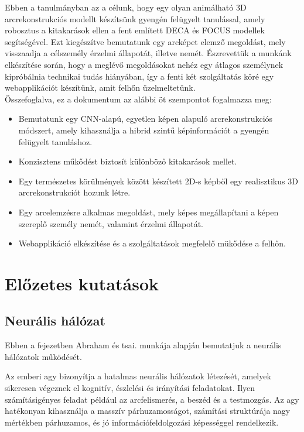 \documentclass[12pt,a4]{article}
\begin{document}
        Ebben a tanulmányban az a célunk, hogy egy olyan animálható 3D arcrekonstrukciós modellt készítsünk gyengén felügyelt tanulással, amely robosztus a kitakarások ellen a fent említett DECA és FOCUS modellek segítségével. Ezt kiegészítve bemutatunk egy arcképet elemző megoldást, mely visszaadja a célszemély érzelmi állapotát, illetve nemét. Észrevettük a munkánk elkészítése során, hogy a meglévő megoldásokat nehéz egy átlagos személynek kipróbálnia technikai tudás hiányában, így a fenti két szolgáltatás köré egy webapplikációt készítünk, amit felhőn üzelmeltetünk.\\

        Összefoglalva, ez a dokumentum az alábbi öt szempontot fogalmazza meg:
        \begin{itemize}
	       \item Bemutatunk egy CNN-alapú, egyetlen képen alapuló arcrekonstrukciós módszert, amely kihasználja a hibrid szintű képinformációt a gyengén felügyelt tanuláshoz.
	       \item Konzisztens műkődést biztosít különböző kitakarások mellet.
	       \item Egy természetes körülmények között készített 2D-s képből egy realisztikus 3D arcrekonstrukciót hozunk létre.
	       \item Egy arcelemzésre alkalmas megoldást, mely képes megállapítani a képen szereplő személy nemét, valamint érzelmi állapotát.
	       \item Webapplikáció elkészítése és a szolgáltatások megfelelő mükődése a felhőn.
        \end{itemize}

    \section{Előzetes kutatások}
	\subsection{Neurális hálózat}
    Ebben a fejezetben \cite{ann}Abraham és tsai. munkája alapján bemutatjuk a neurális hálózatok működését.
    
	\label{NN}
	Az emberi agy bizonyítja a hatalmas neurális hálózatok létezését, amelyek sikeresen végeznek el kognitív, észlelési és irányítási feladatokat. Ilyen számításigényes feladat például az arcfelismerés, a beszéd és a testmozgás. Az agy hatékonyan kihasználja a masszív párhuzamosságot, számítási struktúrája nagy mértékben párhuzamos, és jó információfeldolgozási képességgel rendelkezik.
	
\end{document}
